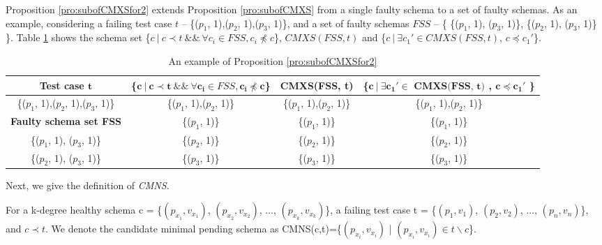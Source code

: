 \documentclass{sig-alternate-05-2015}
\begin{document}
{Proposition \ref{pro:subofCMXSfor2} extends Proposition \ref{pro:subofCMXS} from a single faulty schema to a set of faulty schemas. As an example, considering a failing test case $t$ -- \{($p_{1}$, 1),($p_{2}$, 1),($p_{3}$, 1)\}, and a set of faulty schemas  $FSS$ -- \{ \{($p_{1}$, 1), ($p_{3}$, 1)\},  \{($p_{2}$, 1), ($p_{3}$, 1)\} \}. Table \ref{examleOfCMXSPro2} shows the schema set \{$c\ |\ c \prec t\ \&\&\ \forall c_{i} \in FSS, c_{i} \npreceq c $\}, $CMXS(FSS, t)$ and \{$ c\ |\ \exists c_{1}' \in CMXS(FSS, t)$, $c \preceq c_{1}'$\}.


\begin{table}[ht]
  \centering
  \setlength{\tabcolsep}{2pt}
  \caption{An example of Proposition \ref{pro:subofCMXSfor2}}
    \begin{tabular}{|c|c|c|c|}
    \hline
  \textbf{  Test case $\textbf{t}$} & \textbf{ \{$\textbf{c}\ |\ \textbf{c} \prec \textbf{t}\ \&\&\ \forall \textbf{c}_{\textbf{i}} \in FSS, \textbf{c}_{\textbf{i}} \npreceq \textbf{c}$\} }& \textbf{  CMXS(FSS, t)} & \textbf{\{$ \textbf{c}\ |\ \exists \textbf{c}_{\textbf{1}}' \in \textbf{ CMXS(FSS, t)} $ , $\textbf{c} \preceq \textbf{c}_{\textbf{1}}'$ \}}\\\hline
    \{($p_{1}$, 1),($p_{2}$, 1),($p_{3}$, 1)\}  & \{($p_{1}$, 1),($p_{2}$, 1)\} & \{($p_{1}$, 1),($p_{2}$, 1)\} & \{($p_{1}$, 1),($p_{2}$, 1)\}\\ \cline{1-1}
      \textbf{Faulty schema set FSS}  & \{($p_{1}$, 1)\} & \{($p_{1}$, 1)\} & \{($p_{1}$, 1)\} \\\cline{1-1}
     \{($p_{1}$, 1), ($p_{3}$, 1)\}         & \{($p_{2}$, 1)\} & \{($p_{2}$, 1)\} &\{($p_{2}$, 1)\}\\
      \{($p_{2}$, 1), ($p_{3}$, 1)\}      &       \{($p_{3}$, 1)\} &  \{($p_{3}$, 1)\}&\{($p_{3}$, 1)\}\\ \hline
    \end{tabular}%
  \label{examleOfCMXSPro2}%
\end{table}%
%
%


Next, we give the definition of \emph{CMNS}.

\begin{definition}
For a k-degree healthy schema c = \{$(p_{x_{1}}, v_{x_{1}})$, $(p_{x_{2}}, v_{x_{2}})$, ..., $(p_{x_{k}}, v_{x_{k}})$\}, a failing test case t = \{$(p_{1}, v_{1})$, $(p_{2}, v_{2})$, ..., $(p_{n}, v_{n})$\}, and $c \prec t$. We denote the candidate minimal pending schema as CMNS(c,t)=\{$(p_{x_{i}}, v_{x_{i}})$ | $(p_{x_{i}}, v_{x_{i}}) \in t \backslash c $\}.
\end{definition}

}
\end{document}
